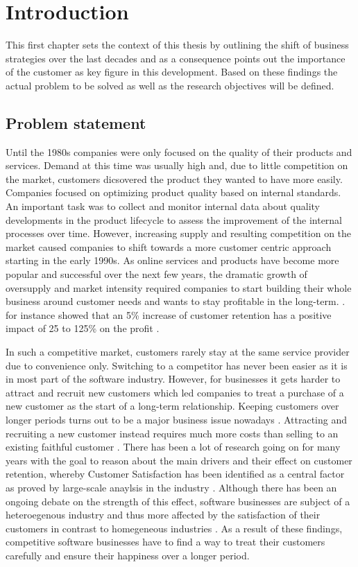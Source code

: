 \chapter{Introduction}
\label{ch:intro}
This first chapter sets the context of this thesis by outlining the shift of business strategies over the last decades and as a consequence points out the importance of the customer as key figure in this development. Based on these findings the actual problem to be solved as well as the research objectives will be defined. 

\section{Problem statement}
Until the 1980s companies were only focused on the quality of their products and services. Demand at this time was usually high and, due to little competition on the market, customers dicsovered the product they wanted to have more easily. Companies focused on optimizing product quality based on internal standards. An important task was to collect and monitor internal data about quality developments in the product lifecycle to assess the improvement of the internal processes over time. However, increasing supply and resulting competition on the market caused companies to shift towards a more customer centric approach starting in the early 1990s. As online services and products have become more popular and successful over the next few years, the dramatic growth of oversupply and market intensity required companies to start building their whole business around customer needs and wants to stay profitable in the long-term. \cite{neckel2015}. \cite{bowen2001relationship} for instance showed that an 5\% increase of customer retention has a positive impact of 25 to 125\% on the profit .

In such a competitive market, customers rarely stay at the same service provider due to convenience only. Switching to a competitor has never been easier \cite{rygielski2002data} as it is in most part of the software industry. However, for businesses it gets harder to attract and recruit new customers which led companies to treat a purchase of a new customer as the start of a long-term relationship. Keeping customers over longer periods turns out to be a major business issue nowadays \cite{nerdinger2015} \cite{neckel2015}. Attracting and recruiting a new customer instead requires much more costs than selling to an existing faithful customer \cite{aydin2006switching}. There has been a lot of research going on for many years with the goal to reason about the main drivers and their effect on customer retention, whereby Customer Satisfaction has been identified as a central factor as proved by large-scale anaylsis in the industry \cite{fornell1992national} \cite{bolton1998dynamic} \cite{gustafsson2005effects}. Although there has been an ongoing debate on the strength of this effect, software businesses are subject of a heteroegenous industry and thus more affected by the satisfaction of their customers in contrast to homegeneous industries \cite{fornell1992national}. As a result of these findings, competitive software businesses have to find a way to treat their customers carefully and ensure their happiness over a longer period. 

